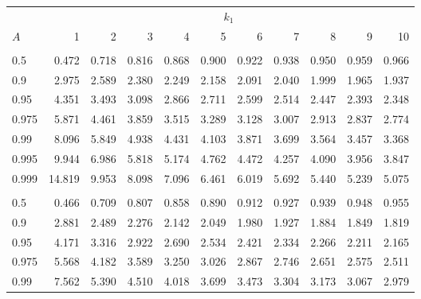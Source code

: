 \documentclass[
]{article}
\begin{document}
\begin{table}[H]
\centering
\begin{tabular}{lrrrrrrrrrr}
\toprule
\multicolumn{1}{c}{ } & \multicolumn{10}{c}{$k_1$} \\
\cmidrule(l{3pt}r{3pt}){2-11}
\hspace{1.1em}$A$ & 1 & 2 & 3 & 4 & 5 & 6 & 7 & 8 & 9 & 10\\
\midrule
\addlinespace[0.3em]
\multicolumn{11}{l}{\textbf{$k_2=20$}}\\
\hspace{1em}0.5 & 0.472 & 0.718 & 0.816 & 0.868 & 0.900 & 0.922 & 0.938 & 0.950 & 0.959 & 0.966\\
\hspace{1em}0.9 & 2.975 & 2.589 & 2.380 & 2.249 & 2.158 & 2.091 & 2.040 & 1.999 & 1.965 & 1.937\\
\hspace{1em}0.95 & 4.351 & 3.493 & 3.098 & 2.866 & 2.711 & 2.599 & 2.514 & 2.447 & 2.393 & 2.348\\
\hspace{1em}0.975 & 5.871 & 4.461 & 3.859 & 3.515 & 3.289 & 3.128 & 3.007 & 2.913 & 2.837 & 2.774\\
\hspace{1em}0.99 & 8.096 & 5.849 & 4.938 & 4.431 & 4.103 & 3.871 & 3.699 & 3.564 & 3.457 & 3.368\\
\hspace{1em}0.995 & 9.944 & 6.986 & 5.818 & 5.174 & 4.762 & 4.472 & 4.257 & 4.090 & 3.956 & 3.847\\
\hspace{1em}0.999 & 14.819 & 9.953 & 8.098 & 7.096 & 6.461 & 6.019 & 5.692 & 5.440 & 5.239 & 5.075\\
\addlinespace[0.3em]
\multicolumn{11}{l}{\textbf{$k_2=30$}}\\
\hspace{1em}0.5 & 0.466 & 0.709 & 0.807 & 0.858 & 0.890 & 0.912 & 0.927 & 0.939 & 0.948 & 0.955\\
\hspace{1em}0.9 & 2.881 & 2.489 & 2.276 & 2.142 & 2.049 & 1.980 & 1.927 & 1.884 & 1.849 & 1.819\\
\hspace{1em}0.95 & 4.171 & 3.316 & 2.922 & 2.690 & 2.534 & 2.421 & 2.334 & 2.266 & 2.211 & 2.165\\
\hspace{1em}0.975 & 5.568 & 4.182 & 3.589 & 3.250 & 3.026 & 2.867 & 2.746 & 2.651 & 2.575 & 2.511\\
\hspace{1em}0.99 & 7.562 & 5.390 & 4.510 & 4.018 & 3.699 & 3.473 & 3.304 & 3.173 & 3.067 & 2.979\\

\end{tabular}
\end{table}
\end{document}
